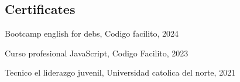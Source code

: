 \begin{CVsidebar}
\LngTextILR



\dotline



\section{Certificates}
\begin{itemlist}
    \item Bootcamp english for debs, Codigo facilito, 2024 
    \item Curso profesional JavaScript, Codigo Facilito, 2023
    \item Tecnico el liderazgo juvenil, Universidad catolica del norte, 2021
\end{itemlist}






\end{CVsidebar}